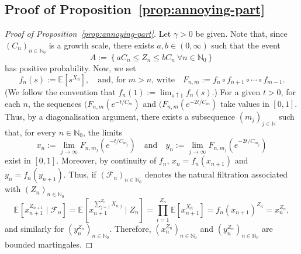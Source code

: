 \documentclass[12pt]{article}
\theoremstyle{definition}
\newcommand{\E}[2][]{\ensuremath{\mathbb{E}_{#1}\left[#2 \right]}}
\begin{document}
\subsection{Proof of Proposition~\ref{prop:annoying-part}} \label{sec:annoying-part}
\begin{proof}[Proof of Proposition~\ref{prop:annoying-part}]
Let $\gamma > 0$ be given. Note that, since $(C_{n})_{n \in \mathbb{N}_0}$ is a growth scale, there exists $a, b \in (0,\infty)$ such that the event
\begin{equation} \label{eq:def-A}
A:=
\left\{
aC_n\leq Z_n\leq bC_n \: \forall n \in \mathbb{N}_0 \right\}
\end{equation}
has positive probability. Now, we set 
\[
f_n(s):=\mathbb E[s^{X_n}], \quad \text{and, for $m > n$, write} \quad F_{n,m}:=f_n\circ f_{n+1}\circ\cdots\circ f_{m-1}.
\]
(We follow the convention that $f_{n}(1) := \lim_{s \uparrow 1} f_{n}(s)$.)
For a given $t > 0$, for each $n$, the sequences $(F_{n,m}(e^{-t/C_{m}})$ and $(F_{n,m}(e^{-2t/C_{m}})$ take values in $[0,1]$. Thus, by a diagonalisation argument, there exists a subsequence $(m_{j})_{j \in \mathbb{N}}$ such that, for every $n \in \mathbb{N}_0$, the limits
\[
x_{n} := \lim_{j \to \infty} F_{n,m_j}\left(e^{-t/C_{m_j}}\right) \quad \text{and} \quad y_n := \lim_{j \to \infty} F_{n,m_j}\left(e^{-2t/C_{m_j}}\right)
\]
exist in $[0,1]$. Moreover, by continuity of $f_n$, $x_n=f_n(x_{n+1})$ and $y_n=f_n(y_{n+1})$. Thus, if $(\mathcal{F}_{n})_{n \in \mathbb{N}_0}$ denotes the natural filtration associated with $(Z_{n})_{n\in \mathbb{N}_0}$ 
\[
\E{x_{n+1}^{Z_{n+1}}\mid\mathcal F_n}= \E{x_{n+1}^{\sum_{j=1}^{Z_{n}} X_{n,j}}\mid Z_n} = 
\prod_{i=1}^{Z_n}\mathbb E[x_{n+1}^{X_{n}}] =
f_n(x_{n+1})^{Z_n} =
x_n^{Z_n},
\]
and similarly for $(y_n^{Z_{n}})_{n \in \mathbb{N}_0}$. Therefore, $(x_n^{Z_{n}})_{n \in \mathbb{N}_0}$ and $(y_n^{Z_{n}})_{n \in \mathbb{N}_0}$ are bounded martingales.


\end{proof}
\end{document}
